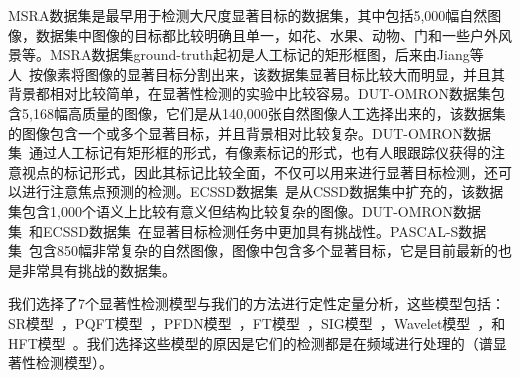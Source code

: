 MSRA数据集是最早用于检测大尺度显著目标的数据集，其中包括5,000幅自然图像，数据集中图像的目标都比较明确且单一，如花、水果、动物、门和一些户外风景等。MSRA数据集ground-truth起初是人工标记的矩形框图，后来由Jiang等人~\cite{JiangHuaizuCVPR2013Discriminative}按像素将图像的显著目标分割出来，该数据集显著目标比较大而明显，并且其背景都相对比较简单，在显著性检测的实验中比较容易。DUT-OMRON数据集\cite{YangChuanCVPR2013Manifold}包含5,168幅高质量的图像，它们是从140,000张自然图像人工选择出来的，该数据集的图像包含一个或多个显著目标，并且背景相对比较复杂。DUT-OMRON数据集~\cite{YangChuanCVPR2013Manifold}通过人工标记有矩形框的形式，有像素标记的形式，也有人眼跟踪仪获得的注意视点的标记形式，因此其标记比较全面，不仅可以用来进行显著目标检测，还可以进行注意焦点预测的检测。ECSSD数据集~\cite{YanQiongCVPR2013Hierarchical}是从CSSD数据集中扩充的，该数据集包含1,000个语义上比较有意义但结构比较复杂的图像。DUT-OMRON数据集~\cite{YangChuanCVPR2013Manifold}和ECSSD数据集~\cite{YanQiongCVPR2013Hierarchical}在显著目标检测任务中更加具有挑战性。PASCAL-S数据集~\cite{LiYinCVPR2014Secrets}包含850幅非常复杂的自然图像，图像中包含多个显著目标，它是目前最新的也是非常具有挑战的数据集。

我们选择了7个显著性检测模型与我们的方法进行定性定量分析，这些模型包括：SR模型~\cite{HouXiaodiCVPR2007Residual}，PQFT模型~\cite{GuoChenleiCVPR2008Spatio}，PFDN模型~\cite{BianCognNeurodyn2010Visual}，FT模型~\cite{AchantaCVPR2009Frequency}，SIG模型~\cite{HouXiaodiTPAMI2012Signature}，Wavelet模型~\cite{ImamogluTMM2013wavelet}，和HFT模型~\cite{LiJianTPAMI2013Scale}。我们选择这些模型的原因是它们的检测都是在频域进行处理的（谱显著性检测模型）。

